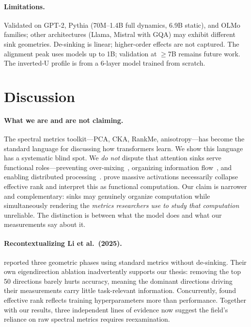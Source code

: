 \documentclass[11pt]{article}
\begin{document}
\paragraph{Limitations.}
Validated on GPT-2, Pythia (70M--1.4B full dynamics, 6.9B static), and OLMo families; other architectures (Llama, Mistral with GQA) may exhibit different sink geometries.
De-sinking is linear; higher-order effects are not captured.
The alignment peak uses models up to 1B; validation at $\geq$7B remains future work.
The inverted-U profile is from a 6-layer model trained from scratch.

\section{Discussion}\label{sec:discussion}

\paragraph{What we are and are not claiming.}
The spectral metrics toolkit---PCA, CKA, RankMe, anisotropy---has become the standard language for discussing how transformers learn.
We show this language has a systematic blind spot.
We \emph{do not} dispute that attention sinks serve functional roles---preventing over-mixing~\citep{barbero2025why}, organizing information flow~\citep{queipodellano2025sinks}, and enabling distributed processing~\citep{zhang2025catch}.
\citet{queipodellano2025sinks} prove massive activations necessarily collapse effective rank and interpret this as functional computation.
Our claim is narrower and complementary: sinks may genuinely organize computation while simultaneously rendering the \emph{metrics researchers use to study that computation} unreliable.
The distinction is between what the model does and what our measurements say about it.

\paragraph{Recontextualizing Li et al.\ (2025).}
\citet{li2025tracing} reported three geometric phases using standard metrics without de-sinking.
Their own eigendirection ablation inadvertently supports our thesis: removing the top 50 directions barely hurts accuracy, meaning the dominant directions driving their measurements carry little task-relevant information.
Concurrently, \citet{kulkarni2026disentangling} found effective rank reflects training hyperparameters more than performance.
Together with our results, three independent lines of evidence now suggest the field's reliance on raw spectral metrics requires reexamination.
\end{document}
